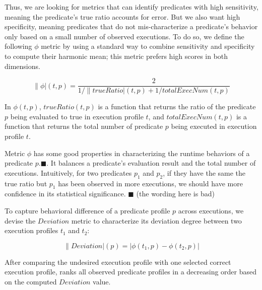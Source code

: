


Thus, we are looking for metrics that can identify
predicates with high sensitivity, meaning the predicate's true
ratio accounts for error. But we also want
high specificity, meaning predicates that do not mis-characterize
a predicate's behavior only based on a small number of
observed executions. To do so, we define the following
$\phi$ metric by using a standard way to
combine sensitivity and specificity to compute their
harmonic mean; this metric prefers high scores in both dimensions. 

\vspace{-3mm}

{\small{
\[
\|\phi|(t, p) = \frac{2}{{1}/{\|trueRatio|(t, p)} + {1}/{totalExecNum(t, p)}}
\]
}}

\vspace{-3mm}

In $\phi(t, p)$, $trueRatio(t, p)$ is a function that returns the ratio of the predicate $p$ being
evaluated to true in execution profile $t$, and $totalExecNum(t, p)$ is a function
that returns the total number of predicate $p$ being executed in execution profile $t$.

Metric $\phi$ has some good properties in characterizing the
runtime behaviors of a predicate $p$.$\blacksquare$.
It balances a predicate's evaluation result and the total number of executions.
Intuitively, for two predicates $p_1$ and $p_2$, if they have the same
the true ratio but $p_1$ has been observed in more executions, we
should have more confidence in its statistical significance. $\blacksquare$
(the wording here is bad)

To capture behavioral difference of a predicate profile $p$
across executions, we devise the  $Deviation$ metric
to characterize its deviation degree between two execution profiles $t_1$ and $t_2$:

\vspace{-2mm}

{\small{
\[
\|Deviation|(p) = |\phi(t_1, p) - \phi(t_2, p)|
\]
}}
\vspace{-4mm}

After comparing the undesired execution profile with one selected correct execution profile,
\ourtool ranks all observed predicate profiles in
a decreasing order based on the computed $Deviation$ value.




